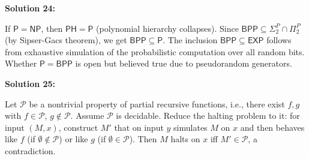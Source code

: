 \documentclass[12pt,a4paper]{exam}
\begin{document}
\vspace{0.5cm}

\textbf{Solution 24:}

If $\mathsf{P} = \mathsf{NP}$, then $\mathsf{PH} = \mathsf{P}$ (polynomial hierarchy collapses). Since $\mathsf{BPP} \subseteq \Sigma_2^P \cap \Pi_2^P$ (by Sipser-Gacs theorem), we get $\mathsf{BPP} \subseteq \mathsf{P}$. The inclusion $\mathsf{BPP} \subseteq \mathsf{EXP}$ follows from exhaustive simulation of the probabilistic computation over all random bits. Whether $\mathsf{P} = \mathsf{BPP}$ is open but believed true due to pseudorandom generators.

\vspace{0.5cm}

\textbf{Solution 25:}

Let $\mathcal{P}$ be a nontrivial property of partial recursive functions, i.e., there exist $f,g$ with $f \in \mathcal{P}$, $g \notin \mathcal{P}$. Assume $\mathcal{P}$ is decidable. Reduce the halting problem to it: for input $(M,x)$, construct $M'$ that on input $y$ simulates $M$ on $x$ and then behaves like $f$ (if $\emptyset \notin \mathcal{P}$) or like $g$ (if $\emptyset \in \mathcal{P}$). Then $M$ halts on $x$ iff $M' \in \mathcal{P}$, a contradiction.

\vspace{0.5cm}
\end{document}
